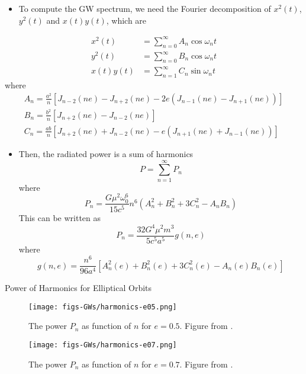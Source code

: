 \documentclass[size=11pt,style=paintings]{powerdot}
\begin{document}
  \begin{slide}{}
 \begin{itemize}
 \item To compute the GW spectrum, we need the Fourier decomposition of $x^{2}(t)$, $y^{2}(t)$  and $x(t) y(t)$, which are
 \end{itemize}
 $$
 \begin{aligned} x^{2}(t) &=\sum_{n=0}^{\infty} A_{n} \cos \omega_{n} t \\ y^{2}(t) &=\sum_{n=0}^{\infty} B_{n} \cos \omega_{n} t \\ x(t) y(t) &=\sum_{n=1}^{\infty} C_{n} \sin \omega_{n} t \end{aligned}
$$
where
$$
\begin{array}{l}{A_{n}=\frac{a^{2}}{n}\left[J_{n-2}(n e)-J_{n+2}(n e)-2 e\left(J_{n-1}(n e)-J_{n+1}(n e)\right)\right]} \\ {B_{n}=\frac{b^{2}}{n}\left[J_{n+2}(n e)-J_{n-2}(n e)\right]} \\ {C_{n}=\frac{a b}{n}\left[J_{n+2}(n e)+J_{n-2}(n e)-e\left(J_{n+1}(n e)+J_{n-1}(n e)\right)\right]}\end{array}
$$
 \end{slide}
 
  \begin{slide}{}
 \begin{itemize}
 \item Then, the radiated power is a sum of harmonics
 $$
P=\sum_{n=1}^{\infty} P_{n}
$$
where 
 $$
P_{n}=\frac{G \mu^{2} \omega_{0}^{6}}{15 c^{5}} n^{6}\left(A_{n}^{2}+B_{n}^{2}+3 C_{n}^{2}-A_{n} B_{n}\right)
$$
This can be written as
$$
\boxed{P_{n}=\frac{32 G^{4} \mu^{2} m^{3}}{5 c^{5} a^{5}} g(n, e)}
$$
where
$$
\boxed{g(n, e)=\frac{n^{6}}{96 a^{4}}\left[A_{n}^{2}(e)+B_{n}^{2}(e)+3 C_{n}^{2}(e)-A_{n}(e) B_{n}(e)\right]}
$$
 \end{itemize}
 \end{slide}
 
 \begin{slide}{Power of Harmonics for Elliptical Orbits}
 \begin{figure}
  \centering
  \texttt{[image: figs-GWs/harmonics-e05.png]}
  \caption{The power $P_n$ as function of $n$ for $e=0.5$. Figure from \cite{2008-Maggiore}.}
\label{fig:polarization}
\end{figure}

 \begin{figure}
  \centering
  \texttt{[image: figs-GWs/harmonics-e07.png]}
  \caption{The power $P_n$ as function of $n$ for $e=0.7$. Figure from \cite{2008-Maggiore}.}
\label{fig:polarization}
\end{figure}
 \end{slide}
 
\end{document}
